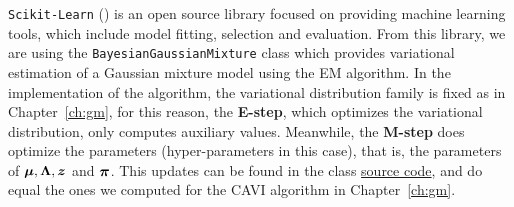 
\texttt{Scikit-Learn} (\cite{scikit-learn}) is an open source library focused on providing machine learning tools, which include model fitting, selection and evaluation. From this library, we are using the \texttt{BayesianGaussianMixture} class which provides variational estimation of a Gaussian mixture model using the EM algorithm.
In the implementation of the algorithm, the variational distribution family is fixed as in Chapter~\ref{ch:gm}, for this reason, the \textbf{E-step}, which optimizes the variational distribution, only computes auxiliary values. Meanwhile, the \textbf{M-step} does optimize the parameters (hyper-parameters in this case), that is, the parameters of \(\bm{\mu}, \bm{\Lambda}, \bm{z}\) and \(\bm{\pi}\). This updates can be found in the class \href{https://github.com/scikit-learn/scikit-learn/blob/0fb307bf3/sklearn/mixture/_bayesian_mixture.py#L65}{source code}, and do equal the ones we computed for the CAVI algorithm in Chapter~\ref{ch:gm}.

